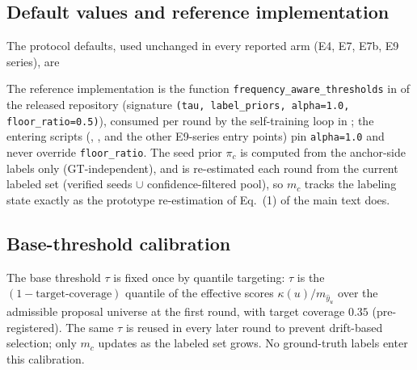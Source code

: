 \documentclass[11pt,a4paper]{article}
\begin{document}
\subsection{Default values and reference implementation}

The protocol defaults, used unchanged in every reported arm (E4, E7, E7b, E9 series), are
\begin{center}
%
\end{center}

The reference implementation is the function \texttt{frequency\_aware\_thresholds} in  of the released repository (signature \texttt{(tau, label\_priors, alpha=1.0, floor\_ratio=0.5)}), consumed per round by the self-training loop in ; the entering scripts (, ,  and the other E9-series entry points) pin \texttt{alpha=1.0} and never override \texttt{floor\_ratio}. The seed prior $\pi_c$ is computed from the anchor-side labels only (GT-independent), and is re-estimated each round from the current labeled set (verified seeds $\cup$ confidence-filtered pool), so $m_c$ tracks the labeling state exactly as the prototype re-estimation of Eq.~(1) of the main text does.

\subsection{Base-threshold calibration}\label{app:mc-calib}

The base threshold $\tau$ is fixed once by quantile targeting: $\tau$ is the $(1 - \text{target-coverage})$ quantile of the effective scores $\kappa(u)/m_{\hat{y}_u}$ over the admissible proposal universe at the first round, with target coverage $0.35$ (pre-registered). The same $\tau$ is reused in every later round to prevent drift-based selection; only $m_c$ updates as the labeled set grows. No ground-truth labels enter this calibration.
\end{document}
